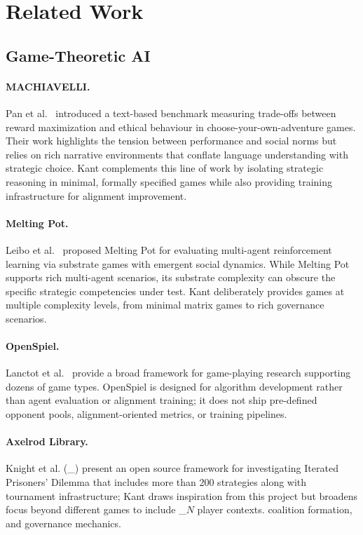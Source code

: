 
\section{Related Work}
\label{sec:related}

\subsection{Game-Theoretic AI}

\paragraph{MACHIAVELLI.}
Pan et al.~\citep{pan2023machiavelli} introduced a text-based benchmark
measuring trade-offs between reward maximization and ethical behaviour
in choose-your-own-adventure games. Their work highlights the tension
between performance and social norms but relies on rich narrative
environments that conflate language understanding with strategic choice.
Kant complements this line of work by isolating strategic reasoning in
minimal, formally specified games while also providing training
infrastructure for alignment improvement.

\paragraph{Melting Pot.}
Leibo et al.~\citep{leibo2021meltingpot} proposed Melting Pot for
evaluating multi-agent reinforcement learning via substrate games with
emergent social dynamics. While Melting Pot supports rich multi-agent
scenarios, its substrate complexity can obscure the specific strategic
competencies under test. Kant deliberately provides games at multiple
complexity levels, from minimal matrix games to rich governance scenarios.

\paragraph{OpenSpiel.}
Lanctot et al.~\citep{lanctot2019openspiel} provide a broad framework
for game-playing research supporting dozens of game types. OpenSpiel is
designed for algorithm development rather than agent evaluation or
alignment training; it does not ship pre-defined opponent pools,
alignment-oriented metrics, or training pipelines.

\paragraph{Axelrod Library.}
Knight et al. (_\citep{knight2016axelrod}) present an open source framework for investigating Iterated Prisoners' Dilemma that includes more than 200 strategies along with tournament infrastructure; Kant draws inspiration from this project but broadens focus beyond different games to include _$N$ player contexts.
coalition formation, and governance mechanics.

